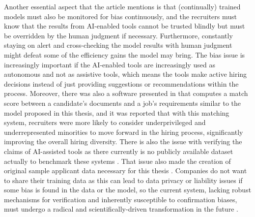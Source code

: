 \documentclass[draft,final]{thesisclass} %
\begin{document}
Another essential aspect that the article \textcite[9-10]{bias_ai_hiring} mentions is that (continually) trained models must also be monitored for bias continuously, and the recruiters must know that the results from \acs{AI}-enabled tools cannot be trusted blindly but must be overridden by the human judgment if necessary.
Furthermore, constantly staying on alert and cross-checking the model results with human judgment might defeat some of the efficiency gains the model may bring.
The bias issue is increasingly important if the \acs{AI}-enabled tools are increasingly used as autonomous and not as assistive tools, which means the tools make active hiring decisions instead of just providing suggestions or recommendations within the process.
Moreover, there was also a software presented in \textcite[10-11]{bias_ai_hiring} that computes a match score between a candidate's documents and a job's requirements similar to the model proposed in this thesis, and it was reported that with this matching system, recruiters were more likely to consider underprivileged and underrepresented minorities to move forward in the hiring process, significantly improving the overall hiring diversity.
There is also the issue with verifying the claims of \acs{AI}-assisted tools as there currently is no publicly available dataset actually to benchmark these systems \parencite[11]{bias_ai_hiring}. That issue also made the creation of original sample applicant data necessary for this thesis \parencite[11]{bias_ai_hiring}.
Companies do not want to share their training data as this can lead to data privacy or liability issues if some bias is found in the data or the model, so the current system, lacking robust mechanisms for verification and inherently susceptible to confirmation biases, must undergo a radical and scientifically-driven transformation in the future \parencite[11]{bias_ai_hiring}.
\end{document}
